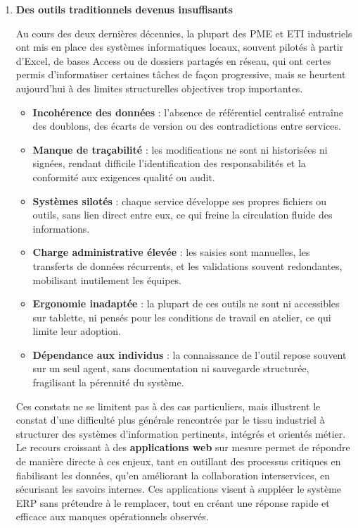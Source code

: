 \documentclass[11pt,a4paper]{article}
\begin{document}
\begin{enumerate}
\item \textbf{Des outils traditionnels devenus insuffisants}

Au cours des deux dernières décennies, la plupart des PME et ETI industriels ont mis en place des systèmes informatiques locaux, souvent pilotés à partir d’Excel, de bases Access ou de dossiers partagés en réseau, qui ont certes permis d’informatiser certaines tâches de façon progressive, mais se heurtent aujourd’hui à des limites structurelles objectives trop importantes.

\begin{itemize}
    \item \textbf{Incohérence des données} : l’absence de référentiel centralisé entraîne des doublons, des écarts de version ou des contradictions entre services.
    
    \item \textbf{Manque de traçabilité} : les modifications ne sont ni historisées ni signées, rendant difficile l’identification des responsabilités et la conformité aux exigences qualité ou audit.
    
    \item \textbf{Systèmes silotés} : chaque service développe ses propres fichiers ou outils, sans lien direct entre eux, ce qui freine la circulation fluide des informations.
    
    \item \textbf{Charge administrative élevée} : les saisies sont manuelles, les transferts de données récurrents, et les validations souvent redondantes, mobilisant inutilement les équipes.
    
    \item \textbf{Ergonomie inadaptée} : la plupart de ces outils ne sont ni accessibles sur tablette, ni pensés pour les conditions de travail en atelier, ce qui limite leur adoption.
    
    \item \textbf{Dépendance aux individus} : la connaissance de l’outil repose souvent sur un seul agent, sans documentation ni sauvegarde structurée, fragilisant la pérennité du système.
\end{itemize}

Ces constats ne se limitent pas à des cas particuliers, mais illustrent le constat d’une difficulté plus générale rencontrée par le tissu industriel à structurer des systèmes d’information pertinents, intégrés et orientés métier. Le recours croissant à des \textbf{ applications web} sur mesure permet de répondre de manière directe à ces enjeux, tant en outillant des processus critiques en fiabilisant les données, qu’en améliorant la collaboration interservices, en sécurisant les savoirs internes. Ces applications visent à suppléer le système ERP sans prétendre à le remplacer, tout en créant une réponse rapide et efficace aux manques opérationnels observés.


\end{enumerate}
\end{document}
